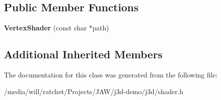 \subsection*{Public Member Functions}
\begin{DoxyCompactItemize}
\item 
\hypertarget{classj3d_1_1ShaderProgram_1_1VertexShader_a57e95dc79e92645cb6a058eee897e7f6}{}{\bfseries Vertex\+Shader} (const char $\ast$path)\label{classj3d_1_1ShaderProgram_1_1VertexShader_a57e95dc79e92645cb6a058eee897e7f6}

\end{DoxyCompactItemize}
\subsection*{Additional Inherited Members}


The documentation for this class was generated from the following file\+:\begin{DoxyCompactItemize}
\item 
/media/will/ratchet/\+Projects/\+J\+A\+W/j3d-\/demo/j3d/shader.\+h\end{DoxyCompactItemize}
